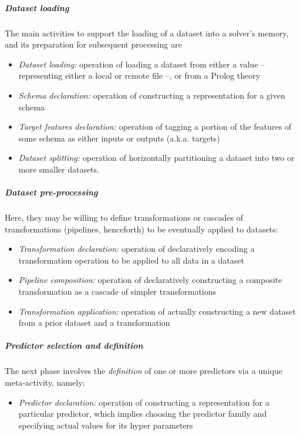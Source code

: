 \documentclass[
]{ceurart}
\begin{document}

\subparagraph{Dataset loading}
%
The main activities to support the loading of a dataset into a solver's memory, and its preparation for subsequent processing are
%
\begin{itemize}
    \item \emph{Dataset loading:} operation of loading a dataset from either a value -- representing either a local or remote file --, or from a Prolog theory
    \item \emph{Schema declaration:}  operation of constructing a representation for a given schema
    \item \emph{Target features declaration:} operation of tagging a portion of the features of some schema as either inputs or outputs (a.k.a. targets)
    \item \emph{Dataset splitting:} operation of horizontally partitioning a dataset into two or more smaller datasets.
\end{itemize}

\subparagraph{Dataset pre-processing}
%
Here, they may be willing to define transformations or cascades of transformations (pipelines, henceforth) to be eventually applied to datasets:
%
\begin{itemize}
    \item \emph{Transformation declaration:} operation of declaratively encoding a transformation operation to be applied to all data in a dataset
    \item \emph{Pipeline composition:} operation of declaratively constructing a composite transformation as a cascade of simpler transformations
    \item \emph{Transformation application:} operation of actually constructing a new dataset from a prior dataset and a transformation
\end{itemize}

\subparagraph{Predictor selection and definition}
%
The next phase involves the \emph{definition} of one or more predictors via a unique meta-activity, namely:
%
\begin{itemize}
    \item \emph{Predictor declaration:} operation of constructing a representation for a particular predictor, which implies choosing the predictor family and specifying actual values for its hyper parameters
\end{itemize}
\end{document}
